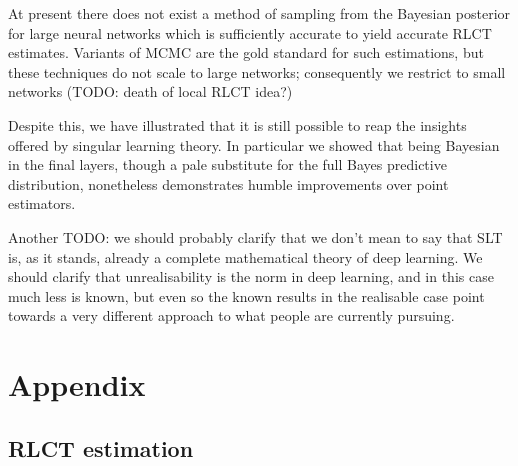 \documentclass{article} %
\begin{document}
At present there does not exist a method of sampling from the Bayesian posterior for large neural networks which is sufficiently accurate to yield accurate RLCT estimates. Variants of MCMC are the gold standard for such estimations, but these techniques do not scale to large networks; consequently we restrict to small networks (TODO: death of local RLCT idea?)


Despite this, we have  illustrated that it is still possible to reap the insights offered by singular learning theory. In particular we showed that being Bayesian in the final layers, though a pale substitute for the full Bayes predictive distribution, nonetheless demonstrates humble improvements over point estimators. 

Another TODO: we should probably clarify that we don't mean to say that SLT is, as it stands, already a complete mathematical theory of deep learning. We should clarify that unrealisability is the norm in deep learning, and in this case much less is known, but even so the known results in the realisable case point towards a very different approach to what people are currently pursuing.
%





\appendix
\section{Appendix}

\subsection{RLCT estimation} \label{appendix:RLCT_estimation}

\end{document}
